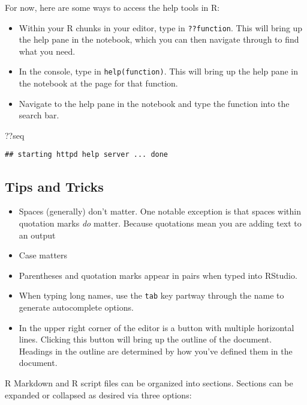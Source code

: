 \documentclass[
]{article}
\newenvironment{Shaded}{\begin{snugshade}}{\end{snugshade}}
\newcommand{\NormalTok}[1]{#1}
\begin{document}
For now, here are some ways to access the help tools in R:

\begin{itemize}
\item
  Within your R chunks in your editor, type in \texttt{??function}. This
  will bring up the help pane in the notebook, which you can then
  navigate through to find what you need.
\item
  In the console, type in \texttt{help(function)}. This will bring up
  the help pane in the notebook at the page for that function.
\item
  Navigate to the help pane in the notebook and type the function into
  the search bar.
\end{itemize}

\begin{Shaded}
\begin{Highlighting}[]
\NormalTok{??seq}
\end{Highlighting}
\end{Shaded}

\begin{verbatim}
## starting httpd help server ... done
\end{verbatim}

\hypertarget{tips-and-tricks}{%
\subsection{Tips and Tricks}\label{tips-and-tricks}}

\begin{itemize}
\item
  Spaces (generally) don't matter. One notable exception is that spaces
  within quotation marks \emph{do} matter. Because quotations mean you
  are adding text to an output
\item
  Case matters
\item
  Parentheses and quotation marks appear in pairs when typed into
  RStudio.
\item
  When typing long names, use the \texttt{tab} key partway through the
  name to generate autocomplete options.
\item
  In the upper right corner of the editor is a button with multiple
  horizontal lines. Clicking this button will bring up the outline of
  the document. Headings in the outline are determined by how you've
  defined them in the document.
\end{itemize}

R Markdown and R script files can be organized into sections. Sections
can be expanded or collapsed as desired via three options:
\end{document}
